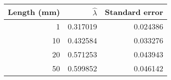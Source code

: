 \begin{tabular}{rrr}
\toprule
 Length (mm) &  $\hat{\lambda}$ &  Standard error \\
\midrule
           1 &         0.317019 &        0.024386 \\
          10 &         0.432584 &        0.033276 \\
          20 &         0.571253 &        0.043943 \\
          50 &         0.599852 &        0.046142 \\
\bottomrule
\end{tabular}
